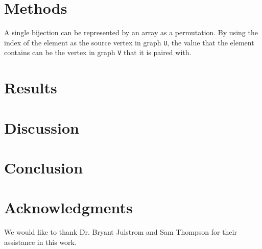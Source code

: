 \documentclass[sigconf]{acmart}
\begin{document}
\section {Methods}
A single bijection can be represented by an array as a permutation. By using the index of the element as the source vertex in graph \verb|U|, the value that the element contains can be the vertex in graph \verb|V| that it is paired with.

\section {Results}

\section {Discussion}

\section {Conclusion}

\section {Acknowledgments}
We would like to thank Dr. Bryant Julstrom and Sam Thompson for their assistance in this work.


{}
\end{document}
